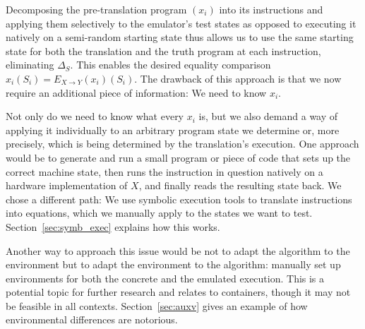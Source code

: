 Decomposing the pre-translation program $(x_i)$ into its instructions and applying them selectively to the emulator's
test states as opposed to executing it natively on a semi-random starting state thus allows us to use the same starting
state for both the translation and the truth program at each instruction, eliminating $\Delta_S$. This enables the
desired equality comparison $x_i(S_i) = E_{X \rightarrow Y}(x_i)(S_i)$. The drawback of this approach is that we now
require an additional piece of information: We need to know $x_i$.

Not only do we need to know what every $x_i$ is, but we also demand a way of applying it individually to an arbitrary
program state we determine or, more precisely, which is being determined by the translation's execution. One approach
would be to generate and run a small program or piece of code that sets up the correct machine state, then runs the
instruction in question natively on a hardware implementation of $X$, and finally reads the resulting state back. We
chose a different path: We use symbolic execution tools to translate instructions into equations, which we manually
apply to the states we want to test. Section~\ref{sec:symb_exec} explains how this works.

Another way to approach this issue would be not to adapt the algorithm to the environment but to adapt the environment
to the algorithm: manually set up environments for both the concrete and the emulated execution. This is a potential
topic for further research and relates to containers, though it may not be feasible in all contexts.
Section~\ref{sec:auxv} gives an example of how environmental differences are notorious.

